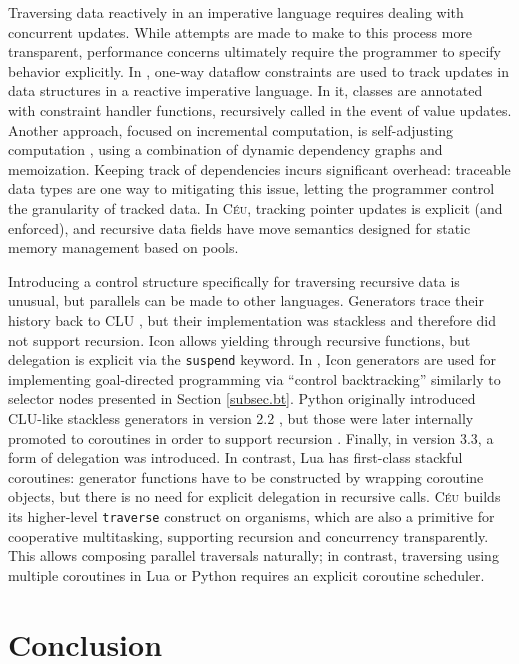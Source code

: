 \documentclass{sig-alternate}
\newcommand{\CEU}{\textsc{C\'{e}u}\xspace}
\newcommand{\code}[1] {{\small{\texttt{#1}}}}
\begin{document}
Traversing data reactively in an imperative language requires
dealing with concurrent updates. While attempts are made to make to this
process more transparent, performance concerns ultimately require the
programmer to specify behavior explicitly. In \cite{ripdataflow}, one-way
dataflow constraints are used to track updates in data structures in a
reactive imperative language. In it, classes are annotated with
constraint handler functions, recursively called in the event
of value updates. Another approach, focused on incremental computation,
is self-adjusting computation \cite{selfadjusting}, using a
combination of dynamic dependency graphs and memoization. Keeping track of
dependencies incurs significant overhead: traceable data types
\cite{traceable} are one way to mitigating this issue, letting the
programmer control the granularity of tracked data. In \CEU, tracking pointer
updates is explicit (and enforced), and recursive data fields have
move semantics designed for static memory management based on pools.

Introducing a control structure specifically for traversing recursive data is
unusual, but parallels can be made to other languages. Generators trace their
history back to CLU \cite{clu}, but their implementation was stackless and
therefore did not support recursion. Icon \cite{icon} allows yielding through
recursive functions, but delegation is explicit via the \code{suspend}
keyword. In \cite{icon}, Icon generators are used for implementing
goal-directed programming via ``control backtracking'' similarly to selector
nodes presented in Section \ref{subsec.bt}. Python originally
introduced CLU-like stackless generators in version 2.2 \cite{pep255}, but
those were later internally promoted to coroutines in order to support
recursion \cite{pep342}. Finally, in version 3.3, a form of delegation was
introduced. In contrast, Lua \cite{lua} has first-class stackful coroutines:
generator functions have to be constructed by wrapping coroutine objects, but
there is no need for explicit delegation in recursive calls. \CEU builds its
higher-level \code{traverse} construct on organisms, which are also a primitive
for cooperative multitasking, supporting recursion and concurrency
transparently. This allows composing parallel traversals naturally; 
in contrast, traversing using multiple coroutines in Lua or Python requires
an explicit coroutine scheduler.

\section{Conclusion}
\label{sec.conclusion}
\end{document}
